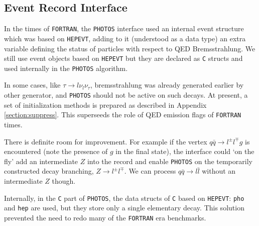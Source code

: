 \documentclass[]{Photos_interface_design}
\begin{document}
 
\subsection{Event Record Interface}
In the times of {\tt FORTRAN}, the {\tt PHOTOS} interface used an internal event structure which was
based on {\tt HEPEVT},
adding to it (understood as a data type) an extra variable defining 
the status of particles with respect to QED Bremsstrahlung. We still use event objects based on {\tt HEPEVT} 
but they are declared as {\tt C} structs and used internally in the {\tt PHOTOS} algorithm.

In some cases, like
$\tau \to l \nu_l \nu_\tau$, bremsstrahlung was already generated earlier
by other generator, and {\tt PHOTOS} should not be active on such decays.
At present,  a set of initialization methods is 
prepared as described in Appendix \ref{section:suppress}. This superseeds 
the role of QED emission flags of {\tt FORTRAN } times. 

There is definite room for 
improvement. For example if the vertex $q \bar q \to l^\pm l^\mp g$ is encountered
(note the presence of $g$ in the final state),
the interface could `on the fly' add an intermediate $Z$ into the record and enable {\tt PHOTOS}
on the temporarily constructed decay branching, $Z \to l^\pm l^\mp $. 
We can process $q\bar q \to l\bar l$ without an intermediate $Z$ though.


Internally, in the {\tt C} part of {\tt PHOTOS}, the data
structs of {\tt C}  based on {\tt HEPEVT}: {\tt pho} and {\tt hep} 
are used, but they store only a single elementary decay. 
This solution  prevented
the need to redo many of the {\tt FORTRAN} era benchmarks.
\end{document}
